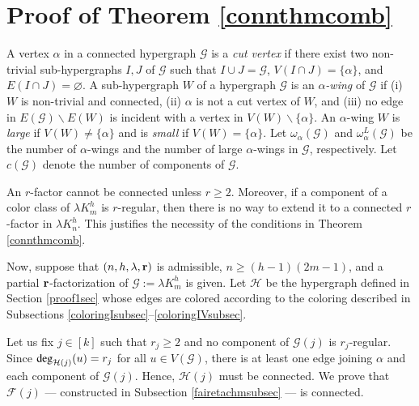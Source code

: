 \documentclass[12pt,oneside]{amsart}
\newcommand\dg{\operatorname{\textup{{\fontfamily{ptm}\selectfont deg}}}}
\newcommand{\cc}{\mathcal}
\begin{document}
\section{Proof of Theorem \ref{connthmcomb}}
 A vertex $\alpha$ in a connected hypergraph $\mathcal G$ is a {\it cut vertex} if there exist two non-trivial sub-hypergraphs $I, J$ of $\mathcal G$ such that  $I\cup J=\mathcal G$,  $V( I\cap  J)=\{\alpha\}$, and  $E( I\cap  J)=\varnothing$. A sub-hypergraph $W$ of a  hypergraph $\mathcal G$ is an {\it $\alpha$-wing} of $\mathcal G$ if (i) $W$ is non-trivial and connected, (ii) $\alpha$ is not a cut vertex of $W$, and (iii) no edge in $E(\mathcal G)\backslash E(W)$ is incident with a vertex in $V(W)\backslash \{\alpha\}$. An $\alpha$-wing $W$ is  {\it large} if $V(W)\neq \{\alpha\}$ and is  {\it small} if $V(W)= \{\alpha\}$. Let $\omega_{\alpha}(\cc G)$ and $\omega^L_{\alpha}(\cc G)$ be the number of $\alpha$-wings and  the number of large $\alpha$-wings in $\cc G$, respectively. Let $c(\cc G)$ denote the number of components of $\cc G$. 

An $r$-factor cannot be connected unless $r\geq 2$.  Moreover, if a component of a color class of $\lambda K_m^h$  is $r$-regular, then there is no way to extend it to a connected $r$-factor in $\lambda K_n^h$. This justifies the necessity of the conditions in Theorem \ref{connthmcomb}.

Now, suppose that $(n,h,\lambda, \vb r)$ is admissible, $n \geq (h-1)(2m-1)$, and  a partial $\vb r$-factorization of $\cc G:=\lambda K_m^h$ is given. Let $\cc H$ be the hypergraph defined in Section \ref{proof1sec} whose edges are colored according to the coloring described in Subsections \ref{coloringIsubsec}--\ref{coloringIVsubsec}.

Let us fix $j\in [k]$ such that $r_j \geq 2$ and no component of $\cc G(j)$ is $r_j$-regular.  Since $\dg_{\cc H(j)}(u) = r_j$ for all $u\in V(\cc G)$, there is at least one edge joining $\alpha$ and each component of $\cc G(j)$. Hence, $\cc H(j)$ must be connected. We  prove that $\cc F(j)$ --- constructed in Subsection \ref{fairetachmsubsec} --- is connected. 
\end{document}
